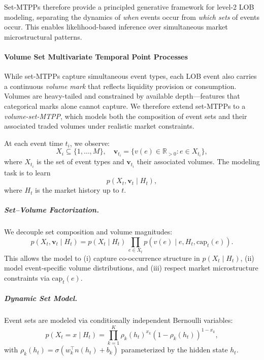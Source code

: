 Set-MTPPs therefore provide a principled generative framework for level-2 LOB modeling, separating the dynamics of \emph{when} events occur from \emph{which sets} of events occur. This enables likelihood-based inference over simultaneous market microstructural patterns.

\paragraph{Volume Set Multivariate Temporal Point Processes}
\label{subsec:vol-set-mtpp}

While set-MTPPs capture simultaneous event types, each LOB event also carries a continuous \emph{volume mark} that reflects liquidity provision or consumption. Volumes are heavy-tailed and constrained by available depth---features that categorical marks alone cannot capture. We therefore extend set-MTPPs to a \emph{volume-set-MTPP}, which models both the composition of event sets and their associated traded volumes under realistic market constraints.

At each event time $t_i$, we observe:
\[
X_i \subseteq \{1,\dots,M\}, \quad 
\mathbf{v}_{t_i} = \{v(e) \in \mathbb{R}_{>0} : e \in X_{t_i}\},
\]
where $X_{t_i}$ is the set of event types and $\mathbf{v}_{t_i}$ their associated volumes. The modeling task is to learn
\[
p(X_t, \mathbf{v}_t \mid H_t),
\]
where $H_t$ is the market history up to $t$.

\subparagraph{Set–Volume Factorization.}
We decouple set composition and volume magnitudes:
\[
p(X_t, \mathbf{v}_t \mid H_t) = p(X_t \mid H_t)\,\prod_{e \in X_t} p(v(e) \mid e, H_t, \text{cap}_t(e)).
\]
This allows the model to (i) capture co-occurrence structure in $p(X_t \mid H_t)$, (ii) model event-specific volume distributions, and (iii) respect market microstructure constraints via $\text{cap}_t(e)$.

\subparagraph{Dynamic Set Model.}
Event sets are modeled via conditionally independent Bernoulli variables:
\[
p(X_t=x \mid H_t) = \prod_{k=1}^K \rho_k(h_t)^{x_k}(1-\rho_k(h_t))^{1-x_k},
\]
with $\rho_k(h_t) = \sigma(w_k^\top n(h_t)+b_k)$ parameterized by the hidden state $h_t$.


